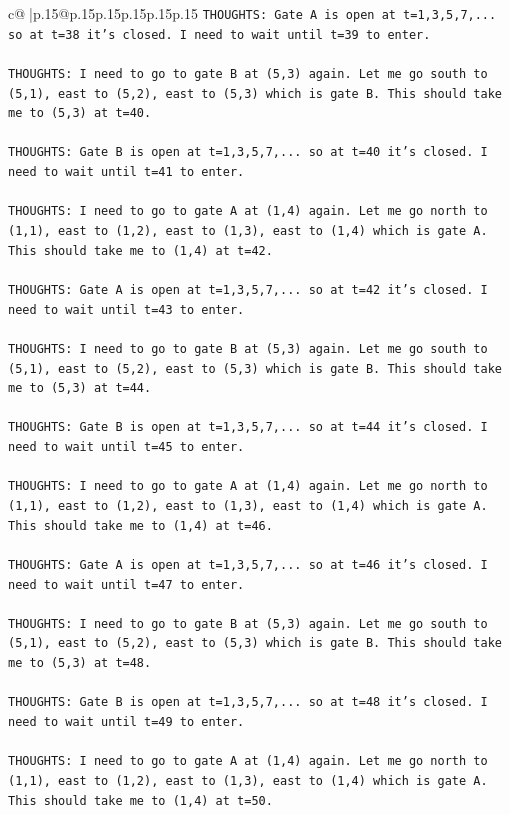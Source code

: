 \documentclass{article}
\begin{document}
{\begin{supertabular}{c@{$\;$}|p{.15\linewidth}@{}p{.15\linewidth}p{.15\linewidth}p{.15\linewidth}p{.15\linewidth}p{.15\linewidth}}
{{{\texttt{THOUGHTS: Gate A is open at t=1,3,5,7,... so at t=38 it's closed. I need to wait until t=39 to enter.} \\
\\ 
\texttt{THOUGHTS: I need to go to gate B at (5,3) again. Let me go south to (5,1), east to (5,2), east to (5,3) which is gate B. This should take me to (5,3) at t=40.} \\
\\ 
\texttt{THOUGHTS: Gate B is open at t=1,3,5,7,... so at t=40 it's closed. I need to wait until t=41 to enter.} \\
\\ 
\texttt{THOUGHTS: I need to go to gate A at (1,4) again. Let me go north to (1,1), east to (1,2), east to (1,3), east to (1,4) which is gate A. This should take me to (1,4) at t=42.} \\
\\ 
\texttt{THOUGHTS: Gate A is open at t=1,3,5,7,... so at t=42 it's closed. I need to wait until t=43 to enter.} \\
\\ 
\texttt{THOUGHTS: I need to go to gate B at (5,3) again. Let me go south to (5,1), east to (5,2), east to (5,3) which is gate B. This should take me to (5,3) at t=44.} \\
\\ 
\texttt{THOUGHTS: Gate B is open at t=1,3,5,7,... so at t=44 it's closed. I need to wait until t=45 to enter.} \\
\\ 
\texttt{THOUGHTS: I need to go to gate A at (1,4) again. Let me go north to (1,1), east to (1,2), east to (1,3), east to (1,4) which is gate A. This should take me to (1,4) at t=46.} \\
\\ 
\texttt{THOUGHTS: Gate A is open at t=1,3,5,7,... so at t=46 it's closed. I need to wait until t=47 to enter.} \\
\\ 
\texttt{THOUGHTS: I need to go to gate B at (5,3) again. Let me go south to (5,1), east to (5,2), east to (5,3) which is gate B. This should take me to (5,3) at t=48.} \\
\\ 
\texttt{THOUGHTS: Gate B is open at t=1,3,5,7,... so at t=48 it's closed. I need to wait until t=49 to enter.} \\
\\ 
\texttt{THOUGHTS: I need to go to gate A at (1,4) again. Let me go north to (1,1), east to (1,2), east to (1,3), east to (1,4) which is gate A. This should take me to (1,4) at t=50.} \\
}}}
\end{supertabular}}
\end{document}
